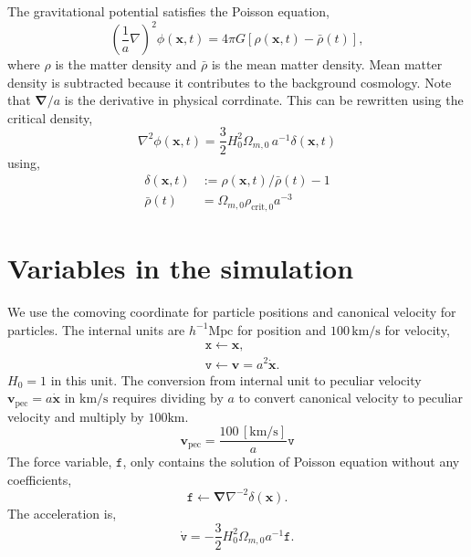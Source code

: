 \documentclass[a4paper]{article}
\begin{document}
The gravitational potential satisfies the Poisson equation,
\begin{equation}
  \left( \frac{1}{a} \nabla \right)^2 \phi(\bm{x}, t)
    = 4\pi G \left[ \rho(\bm{x}, t) - \bar{\rho}(t) \right],
\end{equation}
where $\rho$ is the matter density and $\bar{\rho}$ is the mean matter
density. Mean matter density is subtracted because it contributes to the background cosmology. Note that $\bm{\nabla}/a$ is the derivative in physical
corrdinate. This can be rewritten using the critical density,
\begin{equation}
  \label{eq:poisson2}
  \nabla^2 \phi(\bm{x}, t) =
  \frac{3}{2} H_0^2 \Omega_{m,0} \, a^{-1} \delta(\bm{x}, t)
\end{equation}
using,
\begin{align}
  \delta(\bm{x}, t) &:= \rho(\bm{x}, t)/\bar{\rho}(t) - 1 \\
  \bar{\rho}(t)     &= \Omega_{m,0} \rho_{\mathrm{crit},0} a^{-3}
\end{align}

\section{Variables in the simulation}
We use the comoving coordinate for particle positions and canonical
velocity for particles. The internal units are $h^{-1}
\mathrm{Mpc}$ for position and $100 \,\mathrm{km/s}$ for velocity, 
\begin{align}
  &\texttt{x} \leftarrow \bm{x},\\
  &\texttt{v} \leftarrow \bm{v} = a^2 \dot{\bm{x}}.
\end{align}
$H_0 = 1$ in this unit.
%
The conversion from internal unit to peculiar velocity
$\bm{v}_\mathrm{pec} = a \dot{\bm{x}}$ in $\mathrm{km}/\mathrm{s}$
requires dividing by $a$ to convert canonical velocity to peculiar
velocity and multiply by $100
\mathrm{km}$.
\begin{equation}
  \bm{v}_\mathrm{pec} = \frac{100 \,\mathrm{[km/s]}}{a} \texttt{v}
\end{equation}
%
The force variable, $\texttt{f}$, only contains the solution of Poisson
equation without any coefficients,
%
\begin{equation}
  \texttt{f} \leftarrow \bm{\nabla} \nabla^{-2} \delta(\bm{x}).
\end{equation}
%
The acceleration is,
\begin{equation}
  \dot{\texttt{v}} = -\frac{3}{2} H_0^2 \Omega_{m,0} a^{-1} \texttt{f}.
\end{equation}
\end{document}
